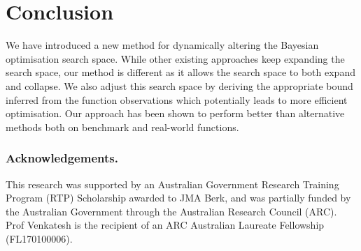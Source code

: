 \documentclass[preprint]{elsarticle}
\begin{document}
\section{Conclusion}\label{sec:Conclusion}
We have introduced a new method for dynamically altering the Bayesian optimisation search space. While other existing approaches keep expanding the search space, our method is different as it allows the search space to both expand and collapse. We also adjust this search space by deriving the appropriate bound inferred from the function observations which potentially leads to more efficient optimisation.
Our approach has been shown to perform better than alternative methods both on benchmark and real-world functions.

\subsubsection*{Acknowledgements.}
This research was supported by an Australian Government Research Training Program
(RTP) Scholarship awarded to JMA Berk, and was partially funded by the Australian
Government through the Australian Research Council (ARC). Prof Venkatesh is the
recipient of an ARC Australian Laureate Fellowship (FL170100006).


\end{document}
